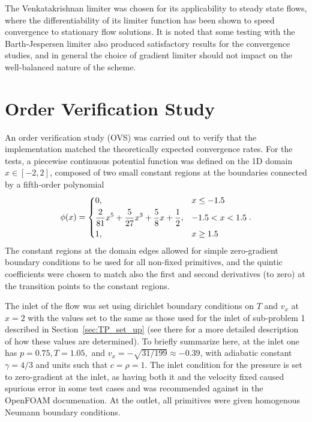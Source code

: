 The Venkatakrishnan limiter was chosen for its applicability to steady state flows, where the differentiability of its limiter function has been shown to speed convergence to stationary flow solutions. It is noted that some testing with the Barth-Jespersen limiter also produced satisfactory results for the convergence studies, and in general the choice of gradient limiter should not impact on the well-balanced nature of the scheme.


\section{Order Verification Study}
\label{sec:OVS}

An order verification study (OVS) was carried out to verify that the implementation matched the theoretically expected convergence rates. For the tests, a piecewise continuous potential function was defined on the 1D domain $x\in[-2,2]$, composed of two small constant regions at the boundaries connected by a fifth-order polynomial
\begin{equation}
\phi(x)=
\begin{dcases} 
      0, & x\leq -1.5 \\
      \frac{2}{81}x^5+\frac{5}{27}x^3+\frac{5}{8}x+\frac{1}{2}, & -1.5<x<1.5 \\
      1, & x\geq 1.5
\end{dcases}.
\end{equation}
The constant regions at the domain edges allowed for simple zero-gradient boundary conditions to be used for all non-fixed primitives, and the quintic coefficients were chosen to match also the first and second derivatives (to zero) at the transition points to the constant regions.

The inlet of the flow was set using dirichlet boundary conditions on $T$ and $v_x$ at $x=2$ with the values set to the same as those used for the inlet of sub-problem 1 described in Section~\ref{sec:TP_set_up} (see there for a more detailed description of how these values are determined). To briefly summarize here, at the inlet one has $p=0.75, T=1.05,$ and $v_x=-\sqrt{31/199}\approx-0.39$, with adiabatic constant $\gamma=4/3$ and units such that $c=\rho=1$. The inlet condition for the pressure is set to zero-gradient at the inlet, as having both it and the velocity fixed caused spurious error in some test cases and was recommended against in the OpenFOAM documenation. At the outlet, all primitives were given homogenous Neumann boundary conditions.

